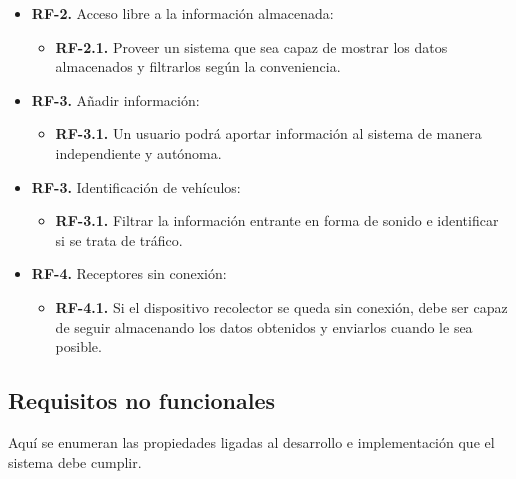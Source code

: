 \begin{itemize}
  \item \textbf{RF-2.} Acceso libre a la información almacenada:
    \begin{itemize}
    \item \textbf{RF-2.1.} Proveer un sistema que sea capaz de mostrar los datos almacenados y filtrarlos según la conveniencia.
    \end{itemize}
\end{itemize}

\begin{itemize}
  \item \textbf{RF-3.} Añadir información:
    \begin{itemize}
    \item \textbf{RF-3.1.} Un usuario podrá aportar información al sistema de manera independiente y autónoma.
    \end{itemize}
\end{itemize}

\begin{itemize}
  \item \textbf{RF-3.} Identificación de vehículos:
    \begin{itemize}
    \item \textbf{RF-3.1.} Filtrar la información entrante en forma de sonido e identificar si se trata de tráfico.
    \end{itemize}
\end{itemize}

\begin{itemize}
  \item \textbf{RF-4.} Receptores sin conexión:
    \begin{itemize}
    \item \textbf{RF-4.1.} Si el dispositivo recolector se queda sin conexión, debe ser capaz de seguir almacenando los datos obtenidos y enviarlos cuando le sea posible.
    \end{itemize}
\end{itemize}

\subsection{Requisitos no funcionales}

Aquí se enumeran las propiedades ligadas al desarrollo e implementación que el sistema debe cumplir.


